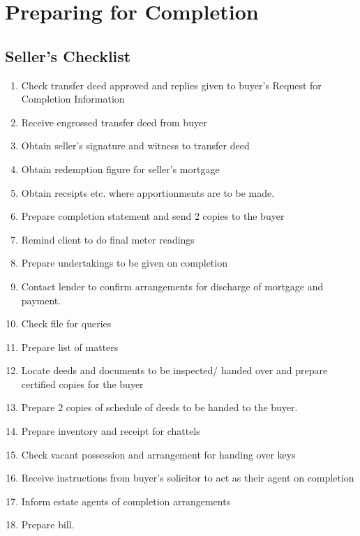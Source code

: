 \documentclass[
]{article}
\providecommand{\tightlist}{%
  \setlength{\itemsep}{0pt}\setlength{\parskip}{0pt}}
\begin{document}
\hypertarget{preparing-for-completion}{%
\section{Preparing for Completion}\label{preparing-for-completion}}

\hypertarget{sellers-checklist}{%
\subsection{Seller's Checklist}\label{sellers-checklist}}

\begin{enumerate}
\def\labelenumi{\arabic{enumi}.}
\tightlist
\item
  Check transfer deed approved and replies given to buyer's Request for
  Completion Information
\item
  Receive engrossed transfer deed from buyer
\item
  Obtain seller's signature and witness to transfer deed
\item
  Obtain redemption figure for seller's mortgage
\item
  Obtain receipts etc. where apportionments are to be made.
\item
  Prepare completion statement and send 2 copies to the buyer
\item
  Remind client to do final meter readings
\item
  Prepare undertakings to be given on completion
\item
  Contact lender to confirm arrangements for discharge of mortgage and
  payment.
\item
  Check file for queries
\item
  Prepare list of matters
\item
  Locate deeds and documents to be inspected/ handed over and prepare
  certified copies for the buyer
\item
  Prepare 2 copies of schedule of deeds to be handed to the buyer.
\item
  Prepare inventory and receipt for chattels
\item
  Check vacant possession and arrangement for handing over keys
\item
  Receive instructions from buyer's solicitor to act as their agent on
  completion
\item
  Inform estate agents of completion arrangements
\item
  Prepare bill.
\end{enumerate}
\end{document}
